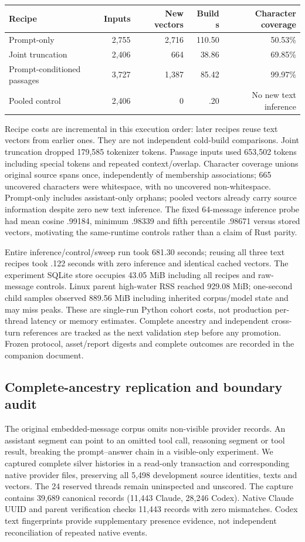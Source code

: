 \documentclass[11pt]{article}
\begin{document}
\begin{center}
\begin{tabular}{lrrrr}
\toprule
Recipe & Inputs & New vectors & Build s & Character coverage\\
\midrule
Prompt-only & 2,755 & 2,716 & 110.50 & 50.53\%\\
Joint truncation & 2,406 & 664 & 38.86 & 69.85\%\\
Prompt-conditioned passages & 3,727 & 1,387 & 85.42 & 99.97\%\\
Pooled control & 2,406 & 0 & .20 & No new text inference\\
\bottomrule
\end{tabular}
\end{center}
Recipe costs are incremental in this execution order: later recipes reuse text
vectors from earlier ones. They are not independent cold-build comparisons.
Joint truncation dropped 179,585 tokenizer tokens. Passage inputs used 653,502
tokens including special tokens and repeated context/overlap. Character coverage
unions original source spans once, independently of membership associations;
665 uncovered characters were whitespace, with no uncovered non-whitespace.
Prompt-only includes assistant-only orphans; pooled vectors already carry source
information despite zero new text inference. The fixed 64-message inference probe
had mean cosine .99184, minimum .98339 and fifth percentile .98671 versus stored
vectors, motivating the same-runtime controls rather than a claim of Rust parity.

Entire inference/control/sweep run took 681.30 seconds; reusing all three text
recipes took .122 seconds with zero inference and identical cached vectors. The
experiment SQLite store occupies 43.05 MiB including all recipes and raw-message
controls. Linux parent high-water RSS reached 929.08 MiB; one-second child samples
observed 889.56 MiB including inherited corpus/model state and may miss peaks.
These are single-run Python cohort costs, not production per-thread latency or
memory estimates. Complete ancestry and independent cross-turn references are
tracked as the next validation step before any promotion. Frozen protocol,
asset/report digests and complete outcomes are recorded in the companion document.

\subsection{Complete-ancestry replication and boundary audit}
The original embedded-message corpus omits non-visible provider records. An
assistant segment can point to an omitted tool call, reasoning segment or tool
result, breaking the prompt--answer chain in a visible-only experiment. We
captured complete silver histories in a read-only transaction and corresponding
native provider files, preserving all 5,498 development source identities,
texts and vectors. The 24 reserved threads remain uninspected and unscored.
The capture contains 39,689 canonical records (11,443 Claude, 28,246 Codex).
Native Claude UUID and parent verification checks 11,443 records with zero
mismatches. Codex text fingerprints provide supplementary presence evidence,
not independent reconciliation of repeated native events.
\end{document}
